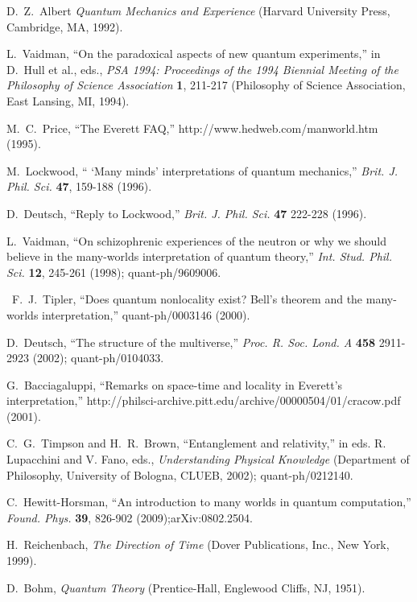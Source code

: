 \documentclass[12pt]{article}
\begin{document}
{\begin{thebibliography}{99}
 D.~Z.~Albert   {\em Quantum Mechanics and Experience}\/ (Harvard University
Press, Cambridge, MA, 1992).

 L.~Vaidman,  ``On the paradoxical aspects of new quantum experiments,''
in D.~Hull et al., eds., {\em PSA 1994: Proceedings of the 1994 Biennial Meeting of the Philosophy of Science Association}\/ {\bf 1}, 211-217 (Philosophy of Science Association, East Lansing, MI, 1994).

  M.~C.~Price, ``The Everett FAQ,'' http://www.hedweb.com/manworld.htm  (1995). 

 M.~Lockwood,   `` `Many minds' interpretations of quantum mechanics,''
{\em Brit. J. Phil. Sci.}\/ {\bf 47}, 159-188 (1996).   

 D.~Deutsch,  ``Reply to Lockwood,'' 
{\em Brit. J. Phil. Sci.}\/ {\bf 47} 222-228 (1996).

 L.~Vaidman,   ``On schizophrenic experiences of the neutron or why we should believe in the many-worlds interpretation of quantum theory,'' {\em Int. Stud. Phil. Sci.}\/
{\bf 12}, 245-261 (1998); quant-ph/9609006.

  ~F.~J.~Tipler,  ``Does quantum nonlocality exist? Bell's theorem and the many-worlds interpretation,'' quant-ph/0003146 (2000).

D.~Deutsch, ``The structure of the multiverse,'' {\em Proc. R. Soc. Lond. A} {\bf 458} 2911-2923 (2002);
quant-ph/0104033.


G.~Bacciagaluppi, ``Remarks on space-time and locality in Everett's interpretation,'' 
 http://philsci-archive.pitt.edu/archive/00000504/01/cracow.pdf (2001).

C.~G.~Timpson and H.~R.~Brown, ``Entanglement and relativity,'' in eds. R. Lupacchini and V. Fano, eds., {\em Understanding Physical Knowledge}\/  (Department of Philosophy, University of Bologna, CLUEB, 2002); quant-ph/0212140.

C.~Hewitt-Horsman, ``An introduction to many worlds in quantum computation,'' {\em Found. Phys.}\/ {\bf 39},
826-902 (2009);arXiv:0802.2504.





H.~Reichenbach, {\em The Direction of Time} (Dover Publications, Inc., New York, 1999).

D.~Bohm,  {\em Quantum Theory}\/ (Prentice-Hall, Englewood Cliffs, NJ, 1951).


\end{thebibliography}}
\end{document}
